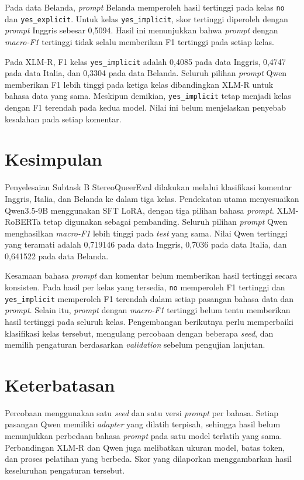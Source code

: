 \documentclass[11pt]{article}
\begin{document}
Pada data Belanda, \textit{prompt} Belanda memperoleh hasil tertinggi pada kelas \texttt{no} dan \texttt{yes\_explicit}. Untuk kelas \texttt{yes\_implicit}, skor tertinggi diperoleh dengan \textit{prompt} Inggris sebesar 0,5094. Hasil ini menunjukkan bahwa \textit{prompt} dengan \textit{macro-F1} tertinggi tidak selalu memberikan F1 tertinggi pada setiap kelas.

Pada XLM-R, F1 kelas \texttt{yes\_implicit} adalah 0,4085 pada data Inggris, 0,4747 pada data Italia, dan 0,3304 pada data Belanda. Seluruh pilihan \textit{prompt} Qwen memberikan F1 lebih tinggi pada ketiga kelas dibandingkan XLM-R untuk bahasa data yang sama. Meskipun demikian, \texttt{yes\_implicit} tetap menjadi kelas dengan F1 terendah pada kedua model. Nilai ini belum menjelaskan penyebab kesalahan pada setiap komentar.

\section{Kesimpulan}
Penyelesaian Subtask B StereoQueerEval dilakukan melalui klasifikasi komentar Inggris, Italia, dan Belanda ke dalam tiga kelas. Pendekatan utama menyesuaikan Qwen3.5-9B menggunakan SFT LoRA, dengan tiga pilihan bahasa \textit{prompt}. XLM-RoBERTa tetap digunakan sebagai pembanding. Seluruh pilihan \textit{prompt} Qwen menghasilkan \textit{macro-F1} lebih tinggi pada \textit{test} yang sama. Nilai Qwen tertinggi yang teramati adalah 0,719146 pada data Inggris, 0,7036 pada data Italia, dan 0,641522 pada data Belanda.

Kesamaan bahasa \textit{prompt} dan komentar belum memberikan hasil tertinggi secara konsisten. Pada hasil per kelas yang tersedia, \texttt{no} memperoleh F1 tertinggi dan \texttt{yes\_implicit} memperoleh F1 terendah dalam setiap pasangan bahasa data dan \textit{prompt}. Selain itu, \textit{prompt} dengan \textit{macro-F1} tertinggi belum tentu memberikan hasil tertinggi pada seluruh kelas. Pengembangan berikutnya perlu memperbaiki klasifikasi kelas tersebut, mengulang percobaan dengan beberapa \textit{seed}, dan memilih pengaturan berdasarkan \textit{validation} sebelum pengujian lanjutan.

\section*{Keterbatasan}
Percobaan menggunakan satu \textit{seed} dan satu versi \textit{prompt} per bahasa. Setiap pasangan Qwen memiliki \textit{adapter} yang dilatih terpisah, sehingga hasil belum menunjukkan perbedaan bahasa \textit{prompt} pada satu model terlatih yang sama. Perbandingan XLM-R dan Qwen juga melibatkan ukuran model, batas token, dan proses pelatihan yang berbeda. Skor yang dilaporkan menggambarkan hasil keseluruhan pengaturan tersebut.
\end{document}
